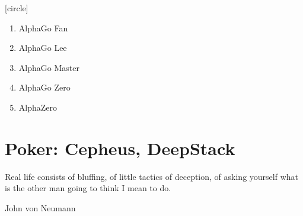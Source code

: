 \documentclass{beamer}
\begin{document}
  {
    [circle]{\color{white}}
    \begin{frame}[standout]
      \pause
      \begin{enumerate}[<+- | alert@+>]
        \item AlphaGo Fan
        \item AlphaGo Lee
        \item AlphaGo Master
        \item AlphaGo Zero
        \item AlphaZero
      \end{enumerate}
    \end{frame}
  }


  \section{Poker: Cepheus, DeepStack}

  {
    \begin{frame}[standout]
      \paperheight
      \color{black}
      \epigraph{
        \tiny
        Real life consists of bluffing, of little tactics of deception, of asking yourself what is the other man going to think I mean to do.
      }{John von Neumann}
    \end{frame}
  }
\end{document}
